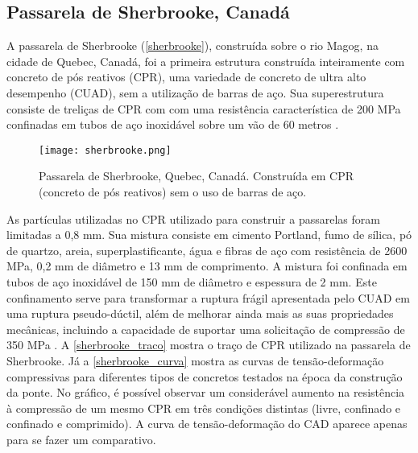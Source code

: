 \subsection{Passarela de Sherbrooke, Canadá}
\label{chap:sher}

A passarela de Sherbrooke (\autoref{sherbrooke}), construída sobre o rio Magog, na cidade de Quebec, Canadá, foi a primeira estrutura construída inteiramente com concreto de pós reativos (CPR), uma variedade de concreto de ultra alto desempenho (CUAD), sem a utilização de barras de aço. Sua superestrutura consiste de treliças de CPR com com uma resistência característica de 200 MPa confinadas em tubos de aço inoxidável sobre um vão de 60 metros \cite[p.~140]{Aitcin_sher}.

\begin{figure}[htb]
	\caption{\label{sherbrooke}Passarela de Sherbrooke, Quebec, Canadá. Construída em CPR (concreto de pós reativos) sem o uso de barras de aço.}
	\begin{center}
	    \texttt{[image: sherbrooke.png]}
	\end{center}
\end{figure}

As partículas utilizadas no CPR utilizado para construir a passarelas foram limitadas a 0,8 mm. Sua mistura consiste em cimento Portland, fumo de sílica, pó de quartzo, areia, superplastificante, água e fibras de aço com resistência de 2600 MPa, 0,2 mm de diâmetro e 13 mm de comprimento. A mistura foi confinada em tubos de aço inoxidável de 150 mm de diâmetro e espessura de 2 mm. Este confinamento serve para transformar a ruptura frágil apresentada pelo CUAD em uma ruptura pseudo-dúctil, além de melhorar ainda mais as suas propriedades mecânicas, incluindo a  capacidade de suportar uma solicitação de compressão de 350 MPa . A \autoref{sherbrooke_traco} mostra o traço de CPR utilizado na passarela de Sherbrooke. Já a \autoref{sherbrooke_curva} mostra as curvas de tensão-deformação compressivas para diferentes tipos de concretos testados na época da construção da ponte. No gráfico, é possível observar um considerável aumento na resistência à compressão de um mesmo CPR em três condições distintas (livre, confinado e confinado e comprimido). A curva de tensão-deformação do CAD aparece apenas para se fazer um comparativo.


